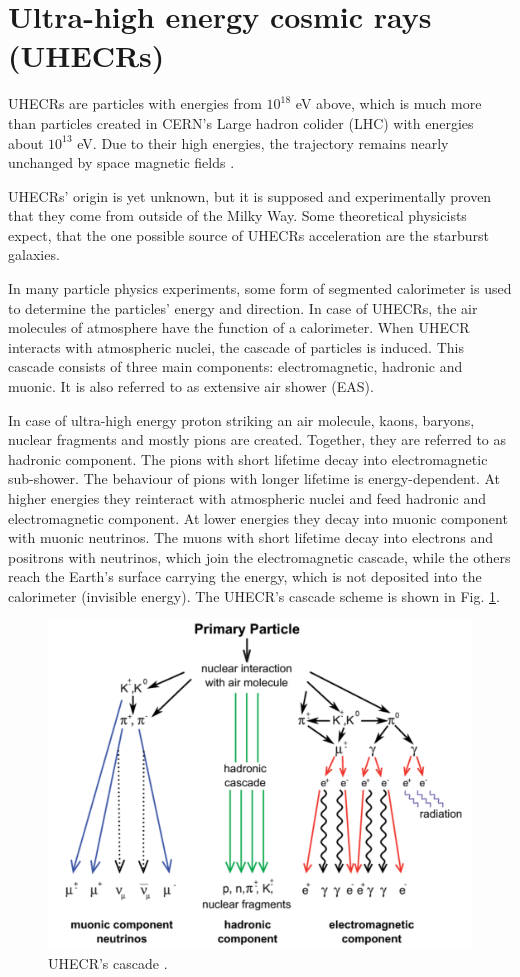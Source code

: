 \section{Ultra-high energy cosmic rays (UHECRs)}
UHECRs are particles with energies from $10^{18}$ eV above, which is much more than particles created in CERN's Large hadron colider (LHC) with energies about $10^{13}$ eV. Due to their high energies, the trajectory remains nearly unchanged by space magnetic fields \cite{Benjamin_Skuse}.
\par
UHECRs' origin is yet unknown, but it is supposed and experimentally proven that they come from outside of the Milky Way. Some theoretical physicists expect, that the one possible source of UHECRs acceleration are the starburst galaxies. 
\par
In many particle physics experiments, some form of segmented calorimeter is used to determine the particles' energy and direction. In case of UHECRs, the air molecules of atmosphere have the function of a calorimeter.
When UHECR interacts with atmospheric nuclei, the cascade of particles is induced. This cascade consists of three main components: electromagnetic, hadronic and muonic. It is also referred to as extensive air shower (EAS).
\par
In case of ultra-high energy proton striking an air molecule, kaons, baryons, nuclear fragments and mostly pions are created. Together, they are referred to as hadronic component. The pions with short lifetime decay into electromagnetic sub-shower. The behaviour of pions with longer lifetime is energy-dependent. At higher energies they reinteract with atmospheric nuclei and feed hadronic and electromagnetic component. At lower energies they decay into muonic component with muonic neutrinos. The muons with short lifetime decay into electrons and positrons with neutrinos, which join the electromagnetic cascade, while the others reach the Earth's surface carrying the energy, which is not deposited into the calorimeter (invisible energy). The UHECR's cascade scheme is shown in Fig. \ref{cascade}. 
\begin{figure}[H]
 \centering
 \includegraphics[scale = 0.3]{./pictures/cascade}
 \caption{UHECR's cascade \cite{Cascades}.}
 \label{cascade}
 
\end{figure}

